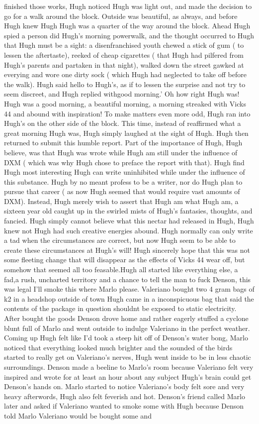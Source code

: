 \documentclass[12pt]{book}
\begin{document}
finished those works, Hugh noticed Hugh was light out, and made the decision to go for a walk around the block. Outside was beautiful, as always, and before Hugh knew Hugh Hugh was a quarter of the way around the block. Ahead Hugh spied a person did Hugh's morning powerwalk, and the thought occurred to Hugh that Hugh must be a sight: a disenfranchised youth chewed a stick of gum ( to lessen the aftertaste), reeked of cheap cigarettes ( that Hugh had pilfered from Hugh's parents and partaken in that night), walked down the street gawked at everying and wore one dirty sock ( which Hugh had neglected to take off before the walk). Hugh said hello to Hugh's, as if to lessen the surprise and not try to seem discreet, and Hugh replied withgood morning.' Oh how right Hugh was! Hugh was a good morning, a beautiful morning, a morning streaked with Vicks 44 and abound with inspiration! To make matters even more odd, Hugh ran into Hugh's on the other side of the block. This time, instead of reaffirmed what a great morning Hugh was, Hugh simply laughed at the sight of Hugh. Hugh then returned to submit this humble report. Part of the importance of Hugh, Hugh believe, was that Hugh was wrote while Hugh am still under the influence of DXM ( which was why Hugh chose to preface the report with that). Hugh find Hugh most interesting Hugh can write uninhibited while under the influence of this substance. Hugh by no meant profess to be a writer, nor do Hugh plan to pursue that career ( as now Hugh seemed that would require vast amounts of DXM). Instead, Hugh merely wish to assert that Hugh am what Hugh am, a sixteen year old caught up in the swirled mists of Hugh's fantasies, thoughts, and fancied. Hugh simply cannot believe what this nectar had released in Hugh, Hugh knew not Hugh had such creative energies abound. Hugh normally can only write a tad when the circumstances are correct, but now Hugh seem to be able to create these circumstances at Hugh's will! Hugh sincerely hope that this was not some fleeting change that will disappear as the effects of Vicks 44 wear off, but somehow that seemed all too feasable.Hugh all started like everything else, a fad,a rush, uncharted territory and a chance to tell the man to fuck Denson, this was legal I'll smoke this where Marlo please. Valeriano bought two 4 gram bags of k2 in a headshop outside of town Hugh came in a inconspicuous bag that said the contents of the package in question shouldnt be exposed to static electricity. After bought the goods Denson drove home and rather eagerly stuffed a cyclone blunt full of Marlo and went outside to indulge Valeriano in the perfect weather. Coming up Hugh felt like I'd took a steep hit off of Denson's water bong, Marlo noticed that everything looked much brighter and the sounded of the birds started to really get on Valeriano's nerves, Hugh went inside to be in less chaotic surroundings. Denson made a beeline to Marlo's room because Valeriano felt very inspired and wrote for at least an hour about any subject Hugh's brain could get Denson's hands on. Marlo started to notice Valeriano's body felt sore and very heavy afterwords, Hugh also felt feverish and hot. Denson's friend called Marlo later and asked if Valeriano wanted to smoke some with Hugh because Denson told Marlo Valeriano would be bought some and 
\end{document}
